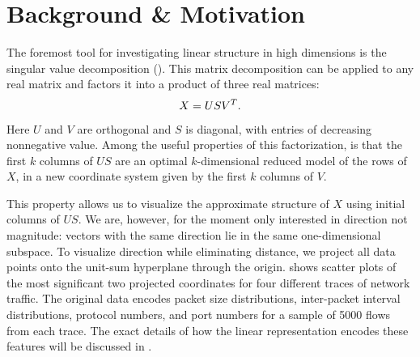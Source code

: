 \documentclass[conference]{IEEEtran}
\begin{document}

\section{Background \& Motivation}



The foremost tool for investigating linear structure in high dimensions is the singular value decomposition ().
This matrix decomposition can be applied to any real matrix and factors it into a product of three real matrices:
\begin{align}
  X = US{V}^T.
\end{align}
Here $U$ and $V$ are orthogonal and $S$ is diagonal, with entries of decreasing nonnegative value.
Among the useful properties of this factorization, is that the first $k$ columns of $US$ are an optimal $k$-dimensional reduced model of the rows of $X$, in a new coordinate system given by the first $k$ columns of $V$\!.\,\svdnote

This property allows us to visualize the approximate structure of $X$ using initial columns of $US$.
We are, however, for the moment only interested in direction not magnitude:
vectors with the same direction lie in the same one-dimensional subspace.
To visualize direction while eliminating distance, we project all data points onto the unit-sum hyperplane through the origin.\projectionnote
{} shows scatter plots of the most significant two projected  coordinates for four different traces of network traffic.
The original data encodes packet size distributions, inter-packet interval distributions,  protocol numbers, and port numbers for a sample of 5000 flows from each trace.
The exact details of how the linear representation encodes these features will be discussed in .
\end{document}
